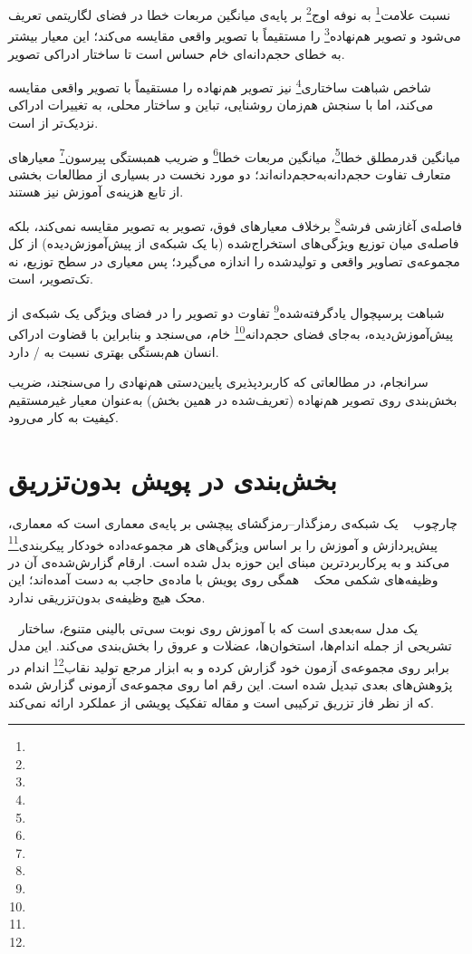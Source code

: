 نسبت علامت\footnote{} به نوفه اوج\footnote{} بر پایه‌ی میانگین مربعات خطا در فضای لگاریتمی تعریف می‌شود و تصویر هم‌نهاده\footnote{} را مستقیماً با تصویر واقعی مقایسه می‌کند؛ این معیار بیشتر به خطای حجم‌دانه‌ای خام حساس است تا ساختار ادراکی تصویر.

شاخص شباهت ساختاری\footnote{} نیز تصویر هم‌نهاده را مستقیماً با تصویر واقعی مقایسه می‌کند، اما با سنجش هم‌زمان روشنایی، تباین و ساختار محلی، به تغییرات ادراکی نزدیک‌تر از  است.

میانگین قدرمطلق خطا\footnote{}، میانگین مربعات خطا\footnote{} و ضریب همبستگی پیرسون\footnote{} معیارهای متعارف تفاوت حجم‌دانه‌به‌حجم‌دانه‌اند؛ دو مورد نخست در بسیاری از مطالعات بخشی از تابع هزینه‌ی آموزش نیز هستند.

فاصله‌ی آغازشی فرشه\footnote{} برخلاف معیارهای فوق، تصویر به تصویر مقایسه نمی‌کند، بلکه فاصله‌ی میان توزیع ویژگی‌های استخراج‌شده (با یک شبکه‌ی از پیش‌آموزش‌دیده) از کل مجموعه‌ی تصاویر واقعی و تولیدشده را اندازه می‌گیرد؛ پس معیاری در سطح توزیع، نه تک‌تصویر، است.

شباهت پرسپچوال یادگرفته‌شده\footnote{} تفاوت دو تصویر را در فضای ویژگی یک شبکه‌ی از پیش‌آموزش‌دیده، به‌جای فضای حجم‌دانه\footnote{} خام، می‌سنجد و بنابراین با قضاوت ادراکی انسان هم‌بستگی بهتری نسبت به / دارد.

سرانجام، در مطالعاتی که کاربردپذیری پایین‌دستی هم‌نهادی را می‌سنجند، ضریب  بخش‌بندی روی تصویر هم‌نهاده (تعریف‌شده در همین بخش) به‌عنوان معیار غیرمستقیم کیفیت به کار می‌رود.


\section{بخش‌بندی در پویش بدون‌تزریق}
\label{sec:seg-gap}

چارچوب ~\cite{isensee2021nnunet} یک شبکه‌ی رمزگذار--رمزگشای پیچشی بر پایه‌ی معماری  است که معماری، پیش‌پردازش و آموزش را بر اساس ویژگی‌های هر مجموعه‌داده خودکار پیکربندی\footnote{} می‌کند و به پرکاربردترین مبنای این حوزه بدل شده است. ارقام گزارش‌شده‌ی آن در وظیفه‌های شکمی محک ~\cite{msd2022} همگی روی پویش با ماده‌ی حاجب به دست آمده‌اند؛ این محک هیچ وظیفه‌ی بدون‌تزریقی ندارد.

~\cite{wasserthal2023} یک مدل  سه‌بعدی است که با آموزش روی  نوبت سی‌تی بالینی متنوع،  ساختار تشریحی از جمله اندام‌ها، استخوان‌ها، عضلات و عروق را بخش‌بندی می‌کند. این مدل  برابر  روی مجموعه‌ی آزمون خود گزارش کرده و به ابزار مرجع تولید نقاب\footnote{} اندام در پژوهش‌های بعدی تبدیل شده است. این رقم اما روی مجموعه‌ی آزمونی گزارش شده که از نظر فاز تزریق ترکیبی است و مقاله تفکیک پویشی از عملکرد ارائه نمی‌کند.


